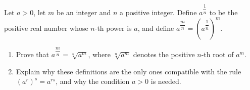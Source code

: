 Let $a>0$, let $m$ be an integer and $n$ a positive integer. Define $a^{\dfrac{1}{n}}$ to be the positive real number whose $n$-th power is $a$, and define $a^{\dfrac{m}{n}}=\left(a^{\dfrac{1}{n}}\right)^m$.
\begin{enumerate}
\item[(a)] Prove that $a^{\dfrac{m}{n}}=\sqrt[n]{a^m}$, where $\sqrt[n]{a^m}$ denotes the positive $n$-th root of $a^m$.
\item[(b)] Explain why these definitions are the only ones compatible with the rule $\left(a^r\right)^s=a^{rs}$, and why the condition $a>0$ is needed.
\end{enumerate}
